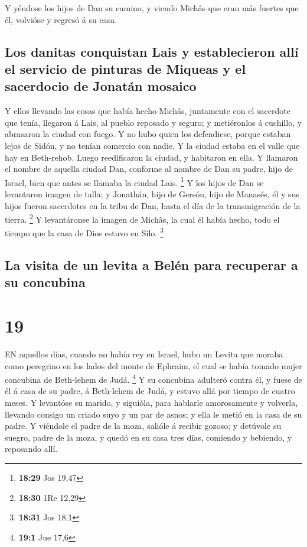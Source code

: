  Y yéndose los hijos de Dan su camino, y viendo Michâs que
eran más fuertes que él, volvióse y regresó á su casa.

\hypertarget{los-danitas-conquistan-lais-y-establecieron-alluxed-el-servicio-de-pinturas-de-miqueas-y-el-sacerdocio-de-jonatuxe1n-mosaico}{%
\subsection{Los danitas conquistan Lais y establecieron allí el servicio
de pinturas de Miqueas y el sacerdocio de Jonatán
mosaico}\label{los-danitas-conquistan-lais-y-establecieron-alluxed-el-servicio-de-pinturas-de-miqueas-y-el-sacerdocio-de-jonatuxe1n-mosaico}}

 Y ellos llevando las cosas que había hecho Michâs,
juntamente con el sacerdote que tenía, llegaron á Lais, al pueblo
reposado y seguro; y metiéronlos á cuchillo, y abrasaron la ciudad con
fuego.  Y no hubo quien los defendiese, porque estaban
lejos de Sidón, y no tenían comercio con nadie. Y la ciudad estaba en el
valle que hay en Beth-rehob. Luego reedificaron la ciudad, y habitaron
en ella.  Y llamaron el nombre de aquella ciudad Dan,
conforme al nombre de Dan su padre, hijo de Israel, bien que antes se
llamaba la ciudad Lais. \footnote{\textbf{18:29} Jos 19,47}
 Y los hijos de Dan se levantaron imagen de talla; y
Jonathán, hijo de Gersón, hijo de Manasés, él y sus hijos fueron
sacerdotes en la tribu de Dan, hasta el día de la transmigración de la
tierra. \footnote{\textbf{18:30} 1Re 12,29}  Y levantáronse
la imagen de Michâs, la cual él había hecho, todo el tiempo que la casa
de Dios estuvo en Silo. \footnote{\textbf{18:31} Jos 18,1}

\hypertarget{la-visita-de-un-levita-a-beluxe9n-para-recuperar-a-su-concubina}{%
\subsection{La visita de un levita a Belén para recuperar a su
concubina}\label{la-visita-de-un-levita-a-beluxe9n-para-recuperar-a-su-concubina}}

\hypertarget{section-18}{%
\section{19}\label{section-18}}

 EN aquellos días, cuando no había rey en Israel, hubo un
Levita que moraba como peregrino en los lados del monte de Ephraim, el
cual se había tomado mujer concubina de Beth-lehem de Judá. \footnote{\textbf{19:1}
  Jue 17,6}  Y su concubina adulteró contra él, y fuese de
él á casa de su padre, á Beth-lehem de Judá, y estuvo allá por tiempo de
cuatro meses.  Y levantóse su marido, y siguióla, para
hablarle amorosamente y volverla, llevando consigo un criado suyo y un
par de asnos; y ella le metió en la casa de su padre.  Y
viéndole el padre de la moza, salióle á recibir gozoso; y detúvole su
suegro, padre de la moza, y quedó en su casa tres días, comiendo y
bebiendo, y reposando allí.

